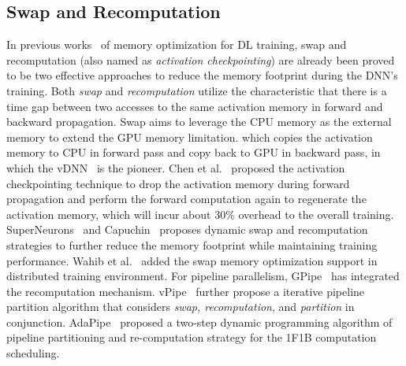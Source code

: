 \subsection{Swap and Recomputation}
In previous works~\cite{vrhuVDNNVirtualizedDeep2016,chenTrainingDeepNets2016,wangSuperneuronsDynamicGPU2018,pengCapuchinTensorbasedGPU2020}
of memory optimization for DL training,
swap and recomputation (also named as \emph{activation checkpointing})
are already been proved to be two
effective approaches to reduce the memory footprint during the DNN's training.
Both \emph{swap} and \emph{recomputation} utilize the characteristic that
there is a time gap between two accesses to the same activation memory
in forward and backward propagation.
Swap aims to leverage the CPU memory as the external memory to extend the GPU memory limitation.
which copies the activation memory to CPU in forward pass
and copy back to GPU in backward pass, in which the vDNN~\cite{rhuVDNNVirtualizedDeep2016} is the pioneer.
Chen et al.~\cite{chenTrainingDeepNets2016} proposed the activation checkpointing technique to drop the
activation memory during forward propagation and perform the forward computation
again to regenerate the activation memory, which will incur about 30\% overhead to the overall training.
SuperNeurons~\cite{wangSuperneuronsDynamicGPU2018} and Capuchin~\cite{pengCapuchinTensorbasedGPU2020} proposes dynamic
swap and recomputation strategies to further reduce the memory footprint while maintaining training performance.
Wahib et al.~\cite{wahib2020scaling} added the swap memory optimization support in distributed training environment.
For pipeline parallelism,
GPipe~\cite{huangGpipeEfficientTraining2019} has integrated the recomputation mechanism.
vPipe~\cite{zhaoVPipeVirtualizedAcceleration2022} further propose a iterative pipeline partition algorithm
that considers \emph{swap, recomputation}, and \emph{partition} in conjunction.
AdaPipe~\cite{sunAdaPipeOptimizingPipeline2024} proposed a two-step dynamic programming algorithm
of pipeline partitioning and re-computation strategy for the 1F1B computation scheduling.

